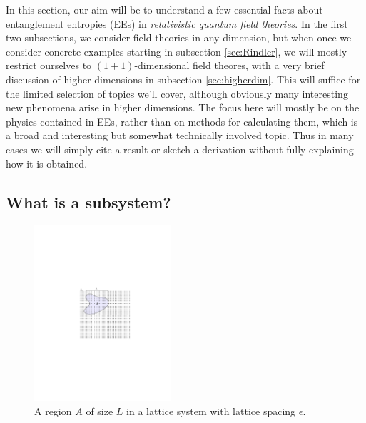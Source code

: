 \documentclass[11pt]{article}
\begin{document}
In this section, our aim will be to understand a few essential facts about entanglement entropies (EEs) in \emph{relativistic quantum field theories}. In the first two subsections, we consider field theories in any dimension, but when once we consider concrete examples starting in subsection \ref{sec:Rindler}, we will mostly restrict ourselves to $(1+1)$-dimensional field theores, with a very brief discussion of higher dimensions in subsection \ref{sec:higherdim}. This will suffice for the limited selection of topics we'll cover, although obviously many interesting new phenomena arise in higher dimensions. The focus here will mostly be on the physics contained in EEs, rather than on methods for calculating them, which is a broad and interesting but somewhat technically involved topic. Thus in many cases we will simply cite a result or sketch a derivation without fully explaining how it is obtained.



\subsection{What is a subsystem?}
\label{sec:subsystem}

\begin{figure}[tbp]
\centering
\includegraphics[width=0.45\textwidth]{figs/lattice}
\caption{\label{fig:lattice}
A region $A$ of size $L$ in a lattice system with lattice spacing $\epsilon$.
}
\end{figure}
\end{document}
